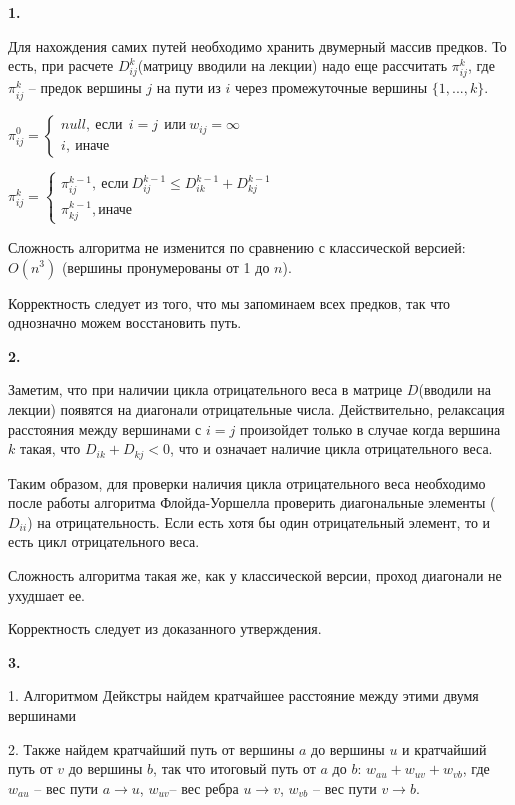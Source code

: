 \documentclass[12pt]{extreport}
\begin{document}
{\bf 1.} 

Для нахождения самих путей необходимо хранить двумерный массив предков. То есть, при расчете $D_{ij}^k$(матрицу вводили на лекции) надо еще рассчитать $\pi_{ij}^k$, где $\pi_{ij}^k$ -- предок вершины $j$ на пути из $i$ через промежуточные вершины $\{1, ..., k\}$.

$\pi_{ij}^0= \begin{cases} null, \ \text{если} \ \: i=j \: \ \text{или}\  w_{ij}=\infty \\  i,  \ \text{иначе}\ \end{cases}$

$\pi_{ij}^k= \begin{cases} \pi_{ij}^{k-1}, \ \text{если} \  D_{ij}^{k-1} \leq D_{ik}^{k-1} + D_{kj}^{k-1} \\ \pi_{kj}^{k-1}, \text{иначе} \end{cases}$

Сложность алгоритма не изменится по сравнению с классической версией: $O(n^3)$ (вершины пронумерованы от 1 до $n$).

Корректность следует из того, что мы запоминаем всех предков, так что однозначно можем восстановить путь. 

\bigskip 
{\bf 2.} 

Заметим, что при наличии цикла отрицательного веса в матрице $D$(вводили на лекции) появятся на диагонали отрицательные числа. Действительно, релаксация расстояния между вершинами с $i=j$ произойдет только в случае когда вершина $k$ такая, что $D_{ik} + D_{kj} <0$, что и означает наличие цикла отрицательного веса. 

Таким образом, для проверки наличия цикла отрицательного веса необходимо после работы алгоритма Флойда-Уоршелла проверить диагональные элементы ($D_{ii}$) на отрицательность. Если есть хотя бы один отрицательный элемент, то и есть цикл отрицательного веса. 

Сложность алгоритма такая же, как у классической версии, проход диагонали не ухудшает ее. 

Корректность следует из доказанного утверждения. 

\bigskip 
{\bf 3.}

1. Алгоритмом Дейкстры найдем кратчайшее расстояние между этими двумя вершинами

2. Также найдем кратчайший путь от вершины $a$ до вершины $u$ и кратчайший путь от $v$ до вершины $b$, так что итоговый путь от $a$ до $b$: $w_{au} + w_{uv} + w_{vb}$, где $w_{au}$ -- вес пути $a \to u$,  $w_{uv}$-- вес ребра $u \to v$,   $w_{vb}$ -- вес пути $v \to b$. 
\end{document}
